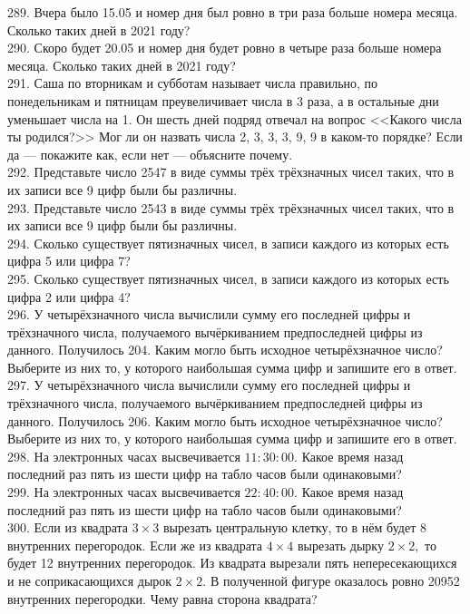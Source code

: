 289. Вчера было 15.05 и номер дня был ровно в три раза больше номера месяца. Сколько таких дней в 2021 году?\\
290. Скоро будет 20.05 и номер дня будет ровно в четыре раза больше номера месяца. Сколько таких дней в 2021 году?\\
291. Саша по вторникам и субботам называет числа правильно, по понедельникам и пятницам преувеличивает числа в 3 раза, а в остальные дни уменьшает числа на 1. Он шесть дней подряд отвечал на вопрос <<Какого числа ты родился?>> Мог ли он назвать числа 2, 3, 3, 3, 9, 9 в каком-то порядке? Если да --- покажите как, если нет --- объясните почему.\\
292. Представьте число 2547 в виде суммы трёх трёхзначных чисел таких, что в их записи все 9 цифр были бы различны.\\
293. Представьте число 2543 в виде суммы трёх трёхзначных чисел таких, что в их записи все 9 цифр были бы различны.\\
294. Сколько существует пятизначных чисел, в записи каждого из которых есть цифра 5 или цифра 7?\\
295. Сколько существует пятизначных чисел, в записи каждого из которых есть цифра 2 или цифра 4?\\
296. У четырёхзначного числа вычислили сумму его последней цифры и трёхзначного числа, получаемого вычёркиванием предпоследней цифры из данного. Получилось 204. Каким могло быть исходное четырёхзначное число? Выберите из них то, у которого наибольшая сумма цифр и запишите его в ответ.\\
297. У четырёхзначного числа вычислили сумму его последней цифры и трёхзначного числа, получаемого вычёркиванием предпоследней цифры из данного. Получилось 206. Каким могло быть исходное четырёхзначное число? Выберите из них то, у которого наибольшая сумма цифр и запишите его в ответ.\\
298. На электронных часах высвечивается $11:30:00.$ Какое время назад последний раз пять из шести цифр на табло часов были одинаковыми?\\
299. На электронных часах высвечивается $22:40:00.$ Какое время назад последний раз пять из шести цифр на табло часов были одинаковыми?\\
300. Если из квадрата $3\times3$ вырезать центральную клетку, то в нём будет 8 внутренних перегородок. Если же из квадрата $4\times4$ вырезать дырку $2\times2,$ то будет 12 внутренних перегородок. Из квадрата вырезали пять непересекающихся и не соприкасающихся дырок $2\times2.$ В полученной фигуре оказалось ровно 20952 внутренних перегородки. Чему равна сторона квадрата?\\
